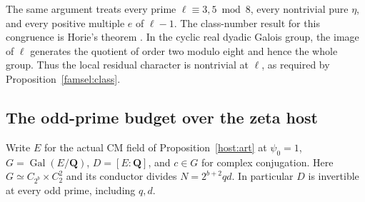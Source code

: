 The same argument treats every prime \(\ell\equiv3,5\bmod8\), every
nontrivial pure \(\eta\), and every positive multiple \(e\) of \(\ell-1\).
The class-number result for this congruence is Horie's theorem
\cite[Proposition 1.1]{fukudaKomatsuWeber}. In the cyclic real dyadic
Galois group, the image of \(\ell\) generates the quotient of order
two modulo eight and hence the whole group. Thus the local residual
character is nontrivial at \(\ell\), as required by
Proposition~\ref{famsel:class}.

\subsection{The odd-prime budget over the zeta host}\label{zetafield:section}

Write \(E\) for the actual CM field of Proposition~\ref{host:art} at
\(\psi_0=1\), \(G=\operatorname{Gal}(E/\mathbf Q)\), \(D=[E:\mathbf Q]\),
and \(c\in G\) for complex conjugation. Here
\(G\simeq C_{2^b}\times C_2^2\) and its conductor divides \(N=2^{b+2}qd\).
In particular \(D\) is invertible at every odd prime, including \(q,d\).

